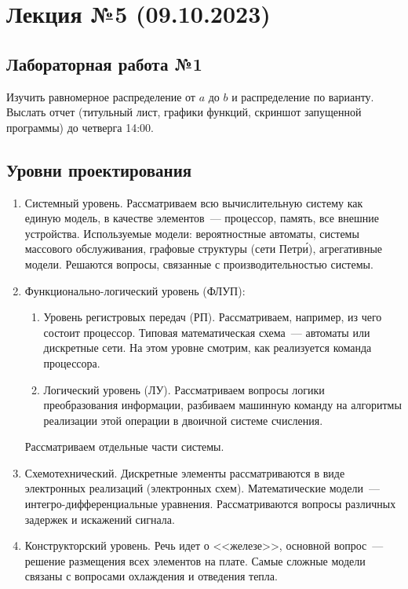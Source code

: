 \section{Лекция №5 (09.10.2023)}

\subsection{Лабораторная работа №1}

Изучить равномерное распределение от $a$ до $b$ и распределение по варианту. Выслать отчет (титульный лист, графики функций, скриншот запущенной программы) до четверга 14:00.

\subsection{Уровни проектирования}

\begin{enumerate}
    \item Системный уровень. Рассматриваем всю вычислительную систему как единую модель, в качестве элементов~--- процессор, память, все внешние устройства. Используемые модели: вероятностные автоматы, системы массового обслуживания, графовые структуры (сети Петр\'{и}), агрегативные модели. Решаются вопросы, связанные с производительностью системы.
    \item Функционально-логический уровень (ФЛУП):
          \begin{enumerate}
              \item Уровень регистровых передач (РП). Рассматриваем, например, из чего состоит процессор. Типовая математическая схема~--- автоматы или дискретные сети. На этом уровне смотрим, как реализуется команда процессора.
              \item Логический уровень (ЛУ). Рассматриваем вопросы логики преобразования информации, разбиваем машинную команду на алгоритмы реализации этой операции в двоичной системе счисления.
          \end{enumerate}
          Рассматриваем отдельные части системы.
    \item Схемотехнический. Дискретные элементы рассматриваются в виде электронных реализаций (электронных схем). Математические модели~--- интегро-дифференциальные уравнения. Рассматриваются вопросы различных задержек и искажений сигнала.
    \item Конструкторский уровень. Речь идет о <<железе>>, основной вопрос~--- решение размещения всех элементов на плате. Самые сложные модели связаны с вопросами охлаждения и отведения тепла.
\end{enumerate}


